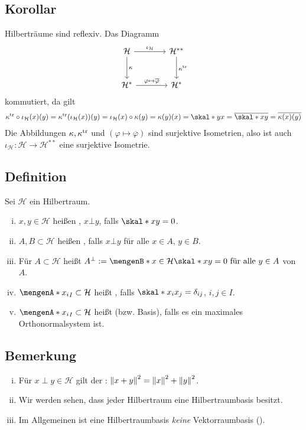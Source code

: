 \subsection{Korollar} %
\label{sub:712}
Hilberträume sind reflexiv.
Das Diagramm
\[
	\begin{tikzcd}[row sep=large, column sep=large]
		\mathcal{H} \rar["\iota_{\mathcal{H}}"] \dar["\kappa"] & \mathcal{H}^{**} \dar["\kappa^\tr"]\\
		\mathcal{H}^* \rar["\varphi \mapsto \overline{\varphi}"] & \mathcal{H}^*
	\end{tikzcd}
\]
kommutiert, da gilt
\begin{align*}
	\kappa^\tr \circ \iota_{\mathcal{H}}(x)(y) = \kappa^\tr \enbrace*{\iota_{\mathcal{H}}(x)}(y)  =\iota_{\mathcal{H}}(x) \circ \kappa (y) 
	= \kappa(y)(x) = \skal*{y}{x} = \overline{\skal*{x}{y}} = \overline{\kappa(x)(y)} 
\end{align*}
Die Abbildungen $\kappa, \kappa^{\mathrm{tr}}$ und $(\varphi \mapsto \overline{\varphi})$ sind surjektive Isometrien, also ist auch 
$\iota_{\mathcal{H}} \colon \mathcal{H} \to \mathcal{H}^{**}$ eine surjektive Isometrie.\bewende

\subsection[Definition: Orthogonal, Orthonormalsystem und Hilbertraumbasis]{Definition} %
\label{sub:713}
Sei $\mathcal{H}$ ein Hilbertraum.
\begin{enumerate}[(i)]
	\item $x,y \in \mathcal{H}$ heißen , $x\bot y$, falls $\skal*{x}{y}=0$.
	\item $A,B  \subset \mathcal{H}$ heißen , falls $x \bot y$ für alle $x \in A$, $y \in B$. 
	\item Für $A \subset \mathcal{H}$ heißt $A^\bot := \set[x \in \mathcal{H}]{\skal*{x}{y}=0 \text{ für alle } y \in A}$  von $A$.
	\item $\set{x_i}_{I} \subset \mathcal{H}$ heißt , falls $\skal*{x_i}{x_j}= \delta_{ij}$, $i,j \in I$.
	\item $\set{x_i}_{I} \subset \mathcal{H}$ heißt  (bzw. Basis), falls es ein maximales Orthonormalsystem ist. 
\end{enumerate}

\subsection{Bemerkung} %
\label{sub:714}
\begin{enumerate}[(i)]
	\item Für $x \perp y \in \mathcal{H}$ gilt der : $\norm{x+y}^2 = \norm{x}^2  + \norm{y}^2$.
	\item Wir werden sehen, dass jeder Hilbertraum eine Hilbertraumbasis besitzt.
	\item Im Allgemeinen ist eine Hilbertraumbasis \emph{keine} Vektorraumbasis ().
\end{enumerate}

